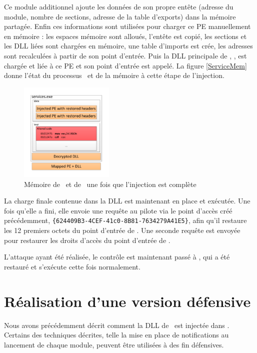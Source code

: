 Ce module additionnel ajoute les données de son propre entête (adresse du module, nombre de sections, adresse de la table d'exports) dans la mémoire partagée.
Enfin ces informations sont utilisées pour charger ce PE manuellement en mémoire : les espaces mémoire sont alloués, l'entête est copié, les sections et les DLL liées sont chargées en mémoire, une table d'imports est crée, les adresses sont recalculées à partir de son point d'entrée.
Puis la DLL principale de \duqu, \netpDLL, est chargée et liée à ce PE et son point d'entrée est appelé.
La figure \ref{ServiceMem} donne l'état du processus \services\ et de la mémoire à cette étape de l'injection.

\begin{figure}[h]
\begin{center}
\includegraphics[width=0.4\textwidth]{supports/duqu/injectionDuquMalware.pdf} 
\end{center}
\caption{Mémoire de \services\ et de \duqu\ une fois que l'injection est complète}
\label{fig:ServiceMem}
\end{figure}

La charge finale contenue dans la DLL est maintenant en place et exécutée.
Une fois qu'elle a fini, elle envoie une requête au pilote via le point d'accès créé précédemment, \texttt{\{624409B3-4CEF-41c0-8B81-7634279A41E5\}}, afin qu'il restaure les 12 premiers octets du point d'entrée de \services.
Une seconde requête est envoyée pour restaurer les droits d'accès du point d'entrée de \services.

L'attaque ayant été réalisée, le contrôle est maintenant passé à \services, qui a été restauré et s'exécute cette fois normalement.

\section{Réalisation d'une version défensive}
Nous avons précédemment décrit comment la DLL de \duqu\ est injectée dans \services.
Certains des techniques décrites, telle la mise en place de notifications au lancement de chaque module, peuvent être utilisées à des fin défensives.

